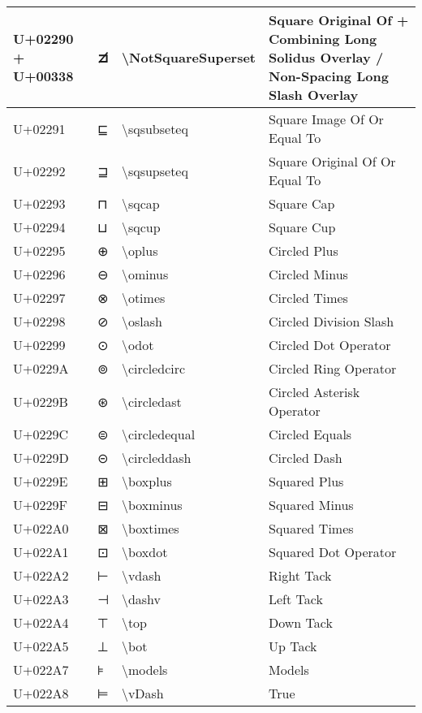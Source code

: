 \begin{table}[h]
\begin{tabulary}{\linewidth}{|L|L|L|L|}
U+02290 + U+00338 & ⊐̸ & {\textbackslash}NotSquareSuperset & Square Original Of + Combining Long Solidus Overlay / Non-Spacing Long Slash Overlay \\
\hline
U+02291 & ⊑ & {\textbackslash}sqsubseteq & Square Image Of Or Equal To \\
\hline
U+02292 & ⊒ & {\textbackslash}sqsupseteq & Square Original Of Or Equal To \\
\hline
U+02293 & ⊓ & {\textbackslash}sqcap & Square Cap \\
\hline
U+02294 & ⊔ & {\textbackslash}sqcup & Square Cup \\
\hline
U+02295 & ⊕ & {\textbackslash}oplus & Circled Plus \\
\hline
U+02296 & ⊖ & {\textbackslash}ominus & Circled Minus \\
\hline
U+02297 & ⊗ & {\textbackslash}otimes & Circled Times \\
\hline
U+02298 & ⊘ & {\textbackslash}oslash & Circled Division Slash \\
\hline
U+02299 & ⊙ & {\textbackslash}odot & Circled Dot Operator \\
\hline
U+0229A & ⊚ & {\textbackslash}circledcirc & Circled Ring Operator \\
\hline
U+0229B & ⊛ & {\textbackslash}circledast & Circled Asterisk Operator \\
\hline
U+0229C & ⊜ & {\textbackslash}circledequal & Circled Equals \\
\hline
U+0229D & ⊝ & {\textbackslash}circleddash & Circled Dash \\
\hline
U+0229E & ⊞ & {\textbackslash}boxplus & Squared Plus \\
\hline
U+0229F & ⊟ & {\textbackslash}boxminus & Squared Minus \\
\hline
U+022A0 & ⊠ & {\textbackslash}boxtimes & Squared Times \\
\hline
U+022A1 & ⊡ & {\textbackslash}boxdot & Squared Dot Operator \\
\hline
U+022A2 & ⊢ & {\textbackslash}vdash & Right Tack \\
\hline
U+022A3 & ⊣ & {\textbackslash}dashv & Left Tack \\
\hline
U+022A4 & ⊤ & {\textbackslash}top & Down Tack \\
\hline
U+022A5 & ⊥ & {\textbackslash}bot & Up Tack \\
\hline
U+022A7 & ⊧ & {\textbackslash}models & Models \\
\hline
U+022A8 & ⊨ & {\textbackslash}vDash & True \\

\end{tabulary}
\end{table}
